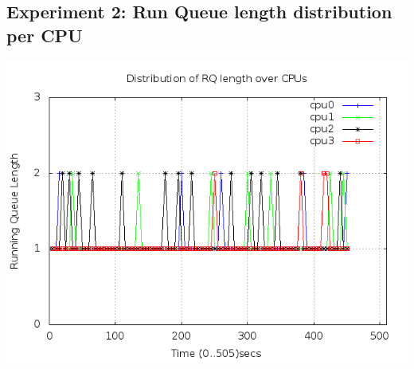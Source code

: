 \documentclass[a4paper,11pt]{report}
\begin{document}
 \subsection{Experiment 2: Run Queue length distribution per CPU}
 \includegraphics[scale=0.6]{rqlength.png}
\end{document}
